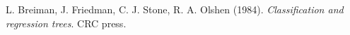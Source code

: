 \begin{thebibliography}{999}

L. Breiman, J. Friedman, C. J. Stone, R. A. Olshen (1984).
\textit{Classification and regression trees}.
CRC press.

\end{thebibliography}
